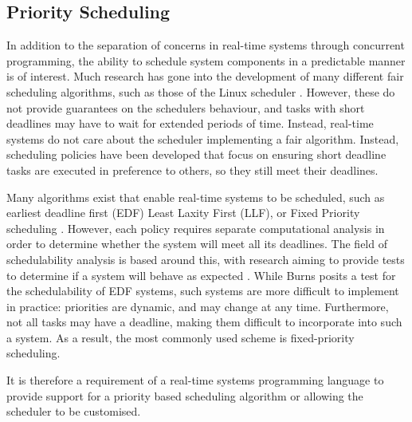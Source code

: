 \subsection{Priority Scheduling}
In addition to the separation of concerns in real-time systems through 
concurrent programming, the ability to schedule system components in a predictable 
manner is of interest. 
Much research has gone into the development of many different fair scheduling 
algorithms, such as those of the Linux scheduler \cite{6043273,7280991}. However, 
these do not provide guarantees on the schedulers behaviour, and tasks with short 
deadlines may have to wait for extended periods of time. Instead, real-time systems 
do not care about the scheduler implementing a fair algorithm. Instead, 
scheduling policies have been developed that focus on ensuring short deadline tasks 
are executed in preference to others, so they still meet their deadlines. 
\par\bigskip\noindent
Many algorithms exist that enable real-time systems to be scheduled, such 
as earliest deadline first (EDF) Least Laxity First (LLF), or Fixed Priority 
scheduling
\cite{real-time-systems}. 
However, each policy requires separate computational analysis in order to determine 
whether the system will meet all its deadlines.
The field of schedulability analysis is based around this, with research 
aiming to provide tests to determine if a system will behave as expected
\cite{4815215,burns-sched-analysis}.
While Burns posits a test for the schedulability of EDF systems, such systems are 
more difficult to implement in practice: priorities are dynamic, and may change 
at any time. Furthermore, not all tasks may have a deadline, making 
them difficult to incorporate into such a system.
As a result, the most commonly used scheme is fixed-priority scheduling. 
\par\bigskip\noindent
It is therefore a requirement of a real-time systems programming language to 
provide support for a priority based scheduling algorithm or allowing the 
scheduler to be customised. 

